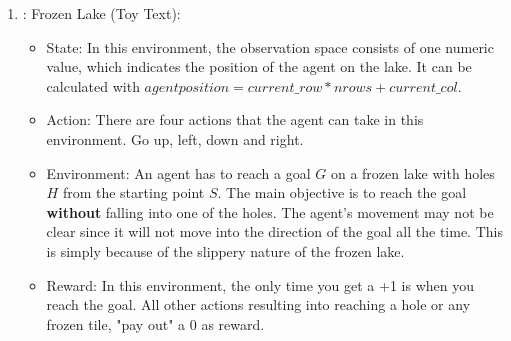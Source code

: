\documentclass{article}
\numberwithin{equation}{section}
\numberwithin{equation}{section}
\begin{document}
\begin{enumerate}
\item : Frozen Lake (Toy Text):
\begin{itemize}
\item State: In this environment, the observation space consists of one numeric value, which indicates the position of the agent on the lake. It can be calculated with $agent{position} = current\_row * nrows + current\_col$.
\item Action: There are four actions that the agent can take in this environment. Go up, left, down and right.
\item Environment: An agent has to reach a goal $G$ on a frozen lake with holes $H$ from the starting point $S$. The main objective is to reach the goal \textbf{without} falling into one of the holes. The agent's movement may not be clear since it will not move into the direction of the goal all the time. This is simply because of the slippery nature of the frozen lake.
\item Reward: In this environment, the only time you get a +1 is when you reach the goal. All other actions resulting into reaching a hole or any frozen tile, "pay out" a 0 as reward.
\end{itemize}


\end{enumerate}

\end{document}

